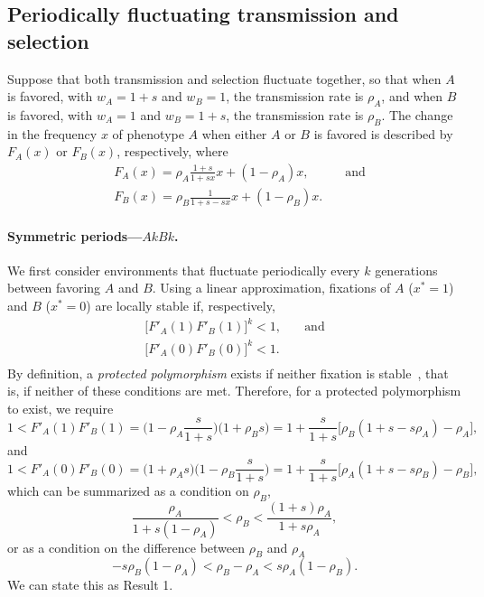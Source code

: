 \documentclass[14pt]{extarticle}
\begin{document}
\subsection*{Periodically fluctuating transmission and selection}

Suppose that both transmission and selection fluctuate together, so that when $A$ is favored, with $w_A=1+s$ and $w_B=1$, the transmission rate is $\rho_A$, and when $B$ is favored, with $w_A=1$ and $w_B=1+s$, the transmission rate is $\rho_B$.
The change in the frequency $x$ of phenotype $A$ when either $A$ or $B$ is favored is described by $F_A(x)$ or $F_B(x)$, respectively, where
\begin{equation}\begin{aligned} \label{eq:recurrence_periodic_fluc}
&F_A(x) = \rho_A \frac{1+s}{1+sx} x + (1-\rho_A)x, &\quad \text{and} \\
&F_B(x) = \rho_B \frac{1}{1+s-sx} x + (1-\rho_B)x.
\end{aligned}\end{equation}

\paragraph{Symmetric periods---$AkBk$.}
We first consider environments that fluctuate periodically every $k$ generations between favoring $A$ and $B$.
Using a linear approximation, fixations of $A$ ($x^*=1$) and $B$ ($x^*=0$) are locally stable if, respectively,
\begin{equation}\begin{aligned}
\big[F'_A(1) F'_B(1)\big]^k < 1,  &\quad \text{and}\\
\big[F'_A(0) F'_B(0)\big]^k < 1. \\
\end{aligned}\end{equation}
By definition, a \emph{protected polymorphism} exists if neither fixation is stable~\citep{Prout1968}, that is, if neither of these conditions are met.
Therefore, for a protected polymorphism to exist, we require
\begin{equation}
1 < F'_A(1) F'_B(1) = \Big(1-\rho_A\frac{s}{1+s}\Big)\Big(1+\rho_B s\Big) 
= 1+\frac{s}{1+s}\big[\rho_B(1+s-s\rho_A)-\rho_A\big],
\end{equation}
and
\begin{equation}
1 < F'_A(0) F'_B(0) = \Big(1+\rho_A s\Big)\Big(1-\rho_B \frac{s}{1+s}\Big) 
= 1+\frac{s}{1+s}\big[\rho_A(1+s-s\rho_B)-\rho_B\big],
\end{equation}
which can be summarized as a condition on $\rho_B$,
\begin{equation} \label{eq:poly_condition_periodic_fluc}
\frac{\rho_A}{1+s(1-\rho_A)} < \rho_B < \frac{(1+s)\rho_A}{1+s\rho_A},
\end{equation}
or as a condition on the difference between $\rho_B$ and $\rho_A$
\begin{equation}
-s\rho_B(1-\rho_A) < \rho_B - \rho_A < s\rho_A(1-\rho_B).
\end{equation}
We can state this as Result 1. 
\end{document}
